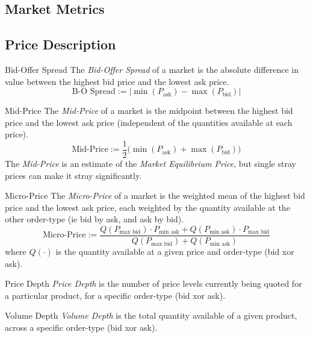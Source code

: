 \documentclass[11pt,a4paper]{article}
\begin{document}
\subsection{Market Metrics} \label{sec_MarketMetrics}

\subsection*{Price Description}

  \begin{definition}{Bid-Offer Spread}
    The \textit{Bid-Offer Spread} of a market is the absolute difference in value between the highest bid price and the lowest ask price.
    \[ \text{B-O Spread}:=\big|\min(P_\text{ask})-\max(P_\text{bid})\big| \]
  \end{definition}

  \begin{definition}{Mid-Price}
    The \textit{Mid-Price} of a market is the midpoint between the highest bid price and the lowest ask price (independent of the quantities available at each price).
    \[ \text{Mid-Price}:=\frac12\big(\min(P_\text{ask})+\max(P_\text{bid})\big) \]
    The \textit{Mid-Price} is an estimate of the \textit{Market Equilibrium Price}, but single stray prices can make it stray significantly.
  \end{definition}

  \begin{definition}{Micro-Price}
    The \textit{Micro-Price} of a market is the weighted mean of the highest bid price and the lowest ask price, each weighted by the quantity available at the other order-type (ie bid by ask, and ask by bid).
    \[ \text{Micro-Price}:=\frac{Q(P_\text{max bid})\cdot P_\text{min ask}+Q(P_\text{min ask})\cdot P_\text{max bid}}{Q(P_\text{max bid})+Q(P_\text{min ask})} \]
    where $Q(\cdot)$ is the quantity available at a given price and order-type (bid xor ask).
  \end{definition}

  \begin{definition}{Price Depth}
    \textit{Price Depth} is the number of price levels currently being quoted for a particular product, for a specific order-type (bid xor ask).
  \end{definition}

  \begin{definition}{Volume Depth}
    \textit{Volume Depth} is the total quantity available of a given product, across a specific order-type (bid xor ask).
  \end{definition}
\end{document}
